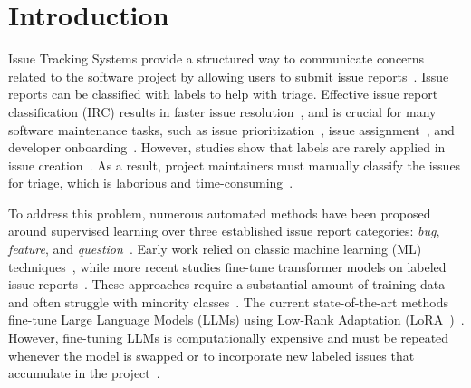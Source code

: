 
\section{Introduction}
\label{sec:01_intro}
Issue Tracking Systems provide a structured way to communicate concerns related to the software project by allowing users to submit issue reports~\cite{colavito2024leveraging}. Issue reports can be classified with labels to help with triage. Effective issue report classification (IRC) results in faster issue resolution~\cite{liao2018exploring}, and is crucial for many software maintenance tasks, such as issue prioritization~\cite{catolino2019not}, issue assignment~\cite{wu2022spatial}, and developer onboarding~\cite{santos2023tag, aracena2025applying}. However, studies show that labels are rarely applied in issue creation~\cite{antoniol2008bug, herzig2013s, kallis2019ticket}. As a result, project maintainers must manually classify the issues for triage, which is laborious and time-consuming~\cite{fan2017road}.

To address this problem, numerous automated methods have been proposed around supervised learning over three established issue report categories: \emph{bug}, \emph{feature}, and \emph{question}~\cite{antoniol2008bug, kallis2019ticket, izadi2022catiss, aracena2025applying, aracena2024applyinglargelanguagemodels}. Early work relied on classic machine learning (ML) techniques~\cite{antoniol2008bug, kallis2019ticket, fan2017road, herzig2013s}, while more recent studies fine-tune transformer models on labeled issue reports~\cite{izadi2022catiss, izadi2022predicting, trautsch2022predicting, bharadwaj2022github, colavito2022issue, wang2021well, gomes2023bert}. These approaches require a substantial amount of training data and often struggle with minority classes~\cite{izadi2022catiss, izadi2022predicting, colavito2022issue, heo2025study, vargovich2023givemelabeledissues}. The current state-of-the-art methods fine-tune Large Language Models (LLMs) using Low-Rank Adaptation (LoRA~\cite{hu2022lora})~\cite{heo2025study, aracena2025applying, aracena2024applyinglargelanguagemodels}. However, fine-tuning LLMs is computationally expensive and must be repeated whenever the model is swapped or to incorporate new labeled issues that accumulate in the project~\cite{fan2017road, kallis2019ticket}.

